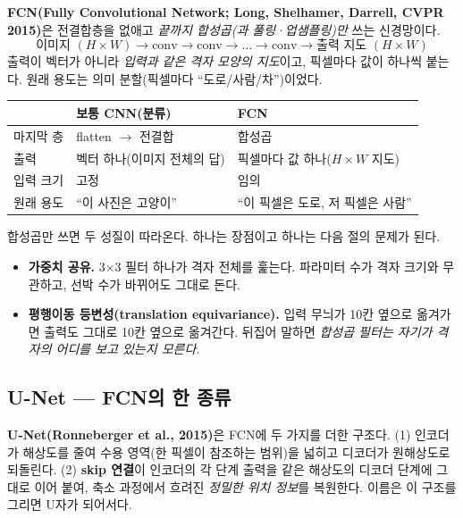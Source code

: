 \documentclass[11pt]{article}
\begin{document}
\textbf{FCN(Fully Convolutional Network; Long, Shelhamer, Darrell, CVPR 2015)}은 전결합층을 없애고
\emph{끝까지 합성곱(과 풀링·업샘플링)만} 쓰는 신경망이다.
\[
\text{이미지 } (H\times W) \to \text{conv} \to \text{conv} \to \dots \to \text{conv} \to \text{출력 지도 } (H \times W)
\]
출력이 벡터가 아니라 \emph{입력과 같은 격자 모양의 지도}이고, 픽셀마다 값이 하나씩 붙는다. 원래 용도는
의미 분할(픽셀마다 ``도로/사람/차'')이었다.

\begin{center}
\small
\begin{tabular}{@{}lll@{}}
\toprule
 & 보통 CNN(분류) & FCN \\
\midrule
마지막 층 & flatten $\to$ 전결합 & 합성곱 \\
출력 & 벡터 하나(이미지 전체의 답) & 픽셀마다 값 하나($H\times W$ 지도) \\
입력 크기 & 고정 & 임의 \\
원래 용도 & ``이 사진은 고양이'' & ``이 픽셀은 도로, 저 픽셀은 사람'' \\
\bottomrule
\end{tabular}
\end{center}

합성곱만 쓰면 두 성질이 따라온다. 하나는 장점이고 하나는 다음 절의 문제가 된다.

\begin{itemize}[leftmargin=*, itemsep=2pt]
\item \textbf{가중치 공유.} 3$\times$3 필터 하나가 격자 전체를 훑는다. 파라미터 수가 격자 크기와 무관하고,
      선박 수가 바뀌어도 그대로 돈다.
\item \textbf{평행이동 등변성(translation equivariance).} 입력 무늬가 10칸 옆으로 옮겨가면 출력도 그대로
      10칸 옆으로 옮겨간다. 뒤집어 말하면 \emph{합성곱 필터는 자기가 격자의 어디를 보고 있는지 모른다.}
\end{itemize}

\subsection*{U-Net --- FCN의 한 종류}

\textbf{U-Net(Ronneberger et al., 2015)}은 FCN에 두 가지를 더한 구조다. (1) 인코더가 해상도를 줄여
수용 영역(한 픽셀이 참조하는 범위)을 넓히고 디코더가 원해상도로 되돌린다. (2) \textbf{skip 연결}이 인코더의
각 단계 출력을 같은 해상도의 디코더 단계에 그대로 이어 붙여, 축소 과정에서 흐려진 \emph{정밀한 위치 정보}를
복원한다. 이름은 이 구조를 그리면 U자가 되어서다.
\end{document}
